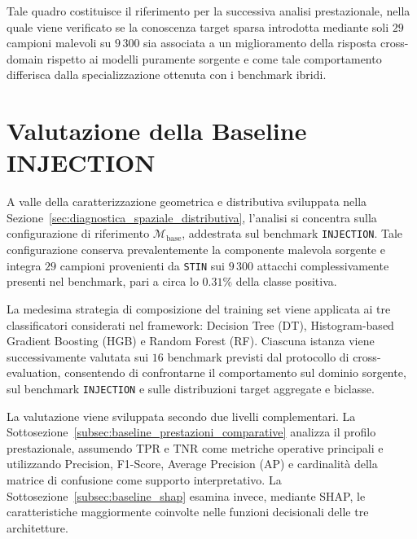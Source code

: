 Tale quadro costituisce il riferimento per la successiva analisi prestazionale, nella quale viene verificato se la conoscenza target sparsa introdotta mediante soli $29$ campioni malevoli su $9\,300$ sia associata a un miglioramento della risposta cross-domain rispetto ai modelli puramente sorgente e come tale comportamento differisca dalla specializzazione ottenuta con i benchmark ibridi.




\section{Valutazione della Baseline INJECTION}
\label{sec:baseline_prestazioni}

A valle della caratterizzazione geometrica e distributiva sviluppata nella Sezione~\ref{sec:diagnostica_spaziale_distributiva}, l'analisi si concentra sulla configurazione di riferimento $\mathcal{M}_{\mathrm{base}}$, addestrata sul benchmark \texttt{INJECTION}. 
Tale configurazione conserva prevalentemente la componente malevola sorgente e integra $29$ campioni provenienti da \texttt{STIN} sui $9\,300$ attacchi complessivamente presenti nel benchmark, pari a circa lo $0.31\%$ della classe positiva.

La medesima strategia di composizione del training set viene applicata ai tre classificatori considerati nel framework: Decision Tree (DT), Histogram-based Gradient Boosting (HGB) e Random Forest (RF). 
Ciascuna
istanza viene successivamente valutata sui $16$ benchmark previsti dal protocollo di cross-evaluation, consentendo di confrontarne il comportamento sul dominio sorgente, sul benchmark \texttt{INJECTION} e sulle distribuzioni target aggregate e biclasse.

La valutazione viene sviluppata secondo due livelli complementari. 
La Sottosezione~\ref{subsec:baseline_prestazioni_comparative} analizza il profilo prestazionale, assumendo TPR e TNR come metriche operative principali e utilizzando Precision, F1-Score, Average Precision (AP) e cardinalità della matrice di confusione come supporto interpretativo. 
La Sottosezione~\ref{subsec:baseline_shap} esamina invece, mediante SHAP, le caratteristiche maggiormente coinvolte nelle funzioni decisionali delle tre architetture.


